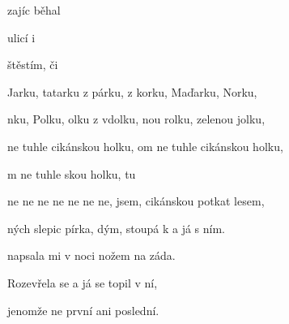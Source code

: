 

\zs
{} zajíc běhal

 

 ulicí i

  štěstím,
či 
\ks

\zr
{} Jarku, tatarku z párku,
 z korku, Maďarku, Norku,

nku, Polku, olku z vdolku,
nou rolku, zelenou jolku,

 ne tuhle cikánskou holku,
om ne tuhle cikánskou holku,

m ne tuhle skou holku,
tu 

 ne ne ne ne ne ne ne,  jsem,
 cikánskou  potkat  lesem,

ných slepic pírka,  dým,
 stoupá k  a já  s ním.
\kr

\zs
{}

napsala mi v noci nožem
na záda.

Rozevřela se a já se
topil v ní,

jenomže ne první ani
poslední.
\ks

\zr \kr

\kp





